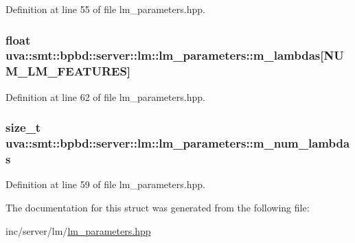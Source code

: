 Definition at line 55 of file lm\+\_\+parameters.\+hpp.

\hypertarget{structuva_1_1smt_1_1bpbd_1_1server_1_1lm_1_1lm__parameters_a0e02b834a11c3473751f9bb902d69993}{}
\subsubsection[{m\+\_\+lambdas}]{\setlength{\rightskip}{0pt plus 5cm}float uva\+::smt\+::bpbd\+::server\+::lm\+::lm\+\_\+parameters\+::m\+\_\+lambdas\mbox{[}N\+U\+M\+\_\+\+L\+M\+\_\+\+F\+E\+A\+T\+U\+R\+E\+S\mbox{]}}\label{structuva_1_1smt_1_1bpbd_1_1server_1_1lm_1_1lm__parameters_a0e02b834a11c3473751f9bb902d69993}


Definition at line 62 of file lm\+\_\+parameters.\+hpp.

\hypertarget{structuva_1_1smt_1_1bpbd_1_1server_1_1lm_1_1lm__parameters_ab44cd993fed6f7b68fe190855dcc2eb4}{}
\subsubsection[{m\+\_\+num\+\_\+lambdas}]{\setlength{\rightskip}{0pt plus 5cm}size\+\_\+t uva\+::smt\+::bpbd\+::server\+::lm\+::lm\+\_\+parameters\+::m\+\_\+num\+\_\+lambdas}\label{structuva_1_1smt_1_1bpbd_1_1server_1_1lm_1_1lm__parameters_ab44cd993fed6f7b68fe190855dcc2eb4}


Definition at line 59 of file lm\+\_\+parameters.\+hpp.



The documentation for this struct was generated from the following file\+:\begin{DoxyCompactItemize}
\item 
inc/server/lm/\hyperlink{lm__parameters_8hpp}{lm\+\_\+parameters.\+hpp}\end{DoxyCompactItemize}
